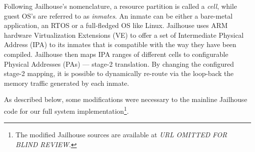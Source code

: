 Following Jailhouse's nomenclature, a resource partition is called a
\emph{cell}, while guest OS's are referred to as \emph{inmates}. An
inmate can be either a bare-metal application, an RTOS or a
full-fledged OS like Linux. Jailhouse uses ARM hardware Virtualization
Extensions (VE) to offer a set of Intermediate Physical Address (IPA)
to its inmates that is compatible with the way they have been
compiled. Jailhouse then maps IPA ranges of different cells to
configurable Physical Addresses (PAs) --- stage-2 translation. By
changing the configured stage-2 mapping, it is possible to dynamically
re-route via the loop-back the memory traffic generated by each
inmate.

As described below, some modifications were necessary to the mainline
Jailhouse code for our full system implementation\footnote{The
  modified Jailhouse sources are available at \emph{URL OMITTED FOR
    BLIND REVIEW}.}.



